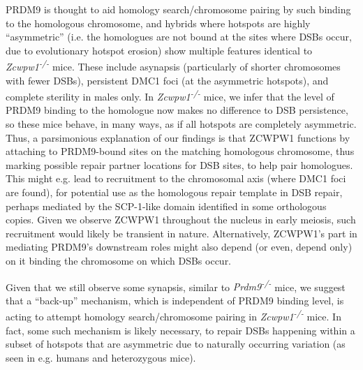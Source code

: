PRDM9 is thought to aid homology search/chromosome pairing by such binding to the homologous chromosome, and hybrids where hotspots are highly “asymmetric” (i.e. the homologues are not bound at the sites where DSBs occur, due to evolutionary hotspot erosion) show multiple features identical to \textit{Zcwpw1\textsuperscript{-/-}} mice.
These include asynapsis (particularly of shorter chromosomes with fewer DSBs), persistent DMC1 foci (at the asymmetric hotspots), and complete sterility in males only.
In \textit{Zcwpw1\textsuperscript{-/-}} mice, we infer that the level of PRDM9 binding to the homologue now makes no difference to DSB persistence, so these mice behave, in many ways, as if all hotspots are completely asymmetric.
Thus, a parsimonious explanation of our findings is that ZCWPW1 functions by attaching to PRDM9-bound sites on the matching homologous chromosome, thus marking possible repair partner locations for DSB sites, to help pair homologues.
This might e.g. lead to recruitment to the chromosomal axis (where DMC1 foci are found), for potential use as the homologous repair template in DSB repair, perhaps mediated by the SCP-1-like domain identified in some orthologous copies.
Given we observe ZCWPW1 throughout the nucleus in early meiosis, such recruitment would likely be transient in nature.
Alternatively, ZCWPW1’s part in mediating PRDM9’s downstream roles might also depend (or even, depend only) on it binding the chromosome on which DSBs occur.

Given that we still observe some synapsis, similar to \textit{Prdm9\textsuperscript{-/-}} mice, we suggest that a ``back-up'' mechanism, which is independent of PRDM9 binding level, is acting to attempt homology search/chromosome pairing in \textit{Zcwpw1\textsuperscript{-/-}} mice.
In fact, some such mechanism is likely necessary, to repair DSBs happening within a subset of hotspots that are asymmetric due to naturally occurring variation (as seen in e.g. humans and heterozygous mice).

\iffalse
If our observed >9-fold changes in relative DMC1 levels for strongly vs. weakly bound hotspots purely reflect increased DMC1 persistence, it might be this mechanism is greatly slower than the PRDM9-dependent pathway for wild-type mice.
In turn, this could explain many – or all – of the downstream phenotypes in these mice, as consequences of delayed homology search.
\fi


